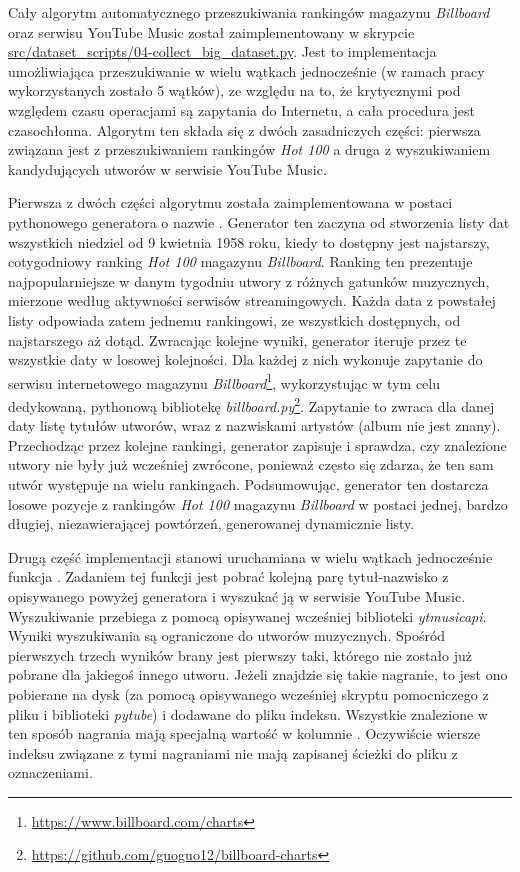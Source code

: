Cały algorytm automatycznego przeszukiwania rankingów magazynu \emph{Billboard} oraz serwisu YouTube Music został zaimplementowany w skrypcie \url{src/dataset_scripts/04-collect_big_dataset.py}. Jest to implementacja umożliwiająca przeszukiwanie w wielu wątkach jednocześnie (w ramach pracy wykorzystanych zostało 5 wątków), ze względu na to, że krytycznymi pod względem czasu operacjami są zapytania do Internetu, a cała procedura jest czasochłonna. Algorytm ten składa się z dwóch zasadniczych części: pierwsza związana jest z przeszukiwaniem rankingów \emph{Hot 100} a druga z wyszukiwaniem kandydujących utworów w serwisie YouTube Music.

Pierwsza z dwóch części algorytmu została zaimplementowana w postaci pythonowego generatora o nazwie . Generator ten zaczyna od stworzenia listy dat wszystkich niedziel od 9 kwietnia 1958 roku, kiedy to dostępny jest najstarszy, cotygodniowy ranking \emph{Hot 100} magazynu \emph{Billboard}. Ranking ten prezentuje najpopularniejsze w danym tygodniu utwory z różnych gatunków muzycznych, mierzone według aktywności serwisów streamingowych. Każda data z powstałej listy odpowiada zatem jednemu rankingowi, ze wszystkich dostępnych, od najstarszego aż dotąd. Zwracając kolejne wyniki, generator iteruje przez te wszystkie daty w losowej kolejności.  Dla każdej z nich wykonuje zapytanie do serwisu internetowego magazynu \emph{Billboard}\footnote{\url{https://www.billboard.com/charts}}, wykorzystując w tym celu dedykowaną, pythonową bibliotekę \emph{billboard.py}\footnote{\url{https://github.com/guoguo12/billboard-charts}}.  Zapytanie to zwraca dla danej daty listę tytułów utworów, wraz z nazwiskami artystów (album nie jest znany). Przechodząc przez kolejne rankingi, generator zapisuje i sprawdza, czy znalezione utwory nie były już wcześniej zwrócone, ponieważ często się zdarza, że ten sam utwór występuje na wielu rankingach. Podsumowując, generator ten dostarcza losowe pozycje z rankingów \emph{Hot 100} magazynu \emph{Billboard} w postaci jednej, bardzo długiej, niezawierającej powtórzeń, generowanej dynamicznie listy.

Drugą część implementacji stanowi uruchamiana w wielu wątkach jednocześnie funkcja . Zadaniem tej funkcji jest pobrać kolejną parę tytuł-nazwisko z opisywanego powyżej generatora i wyszukać ją w serwisie YouTube Music. Wyszukiwanie przebiega z pomocą opisywanej wcześniej biblioteki \emph{ytmusicapi}. Wyniki wyszukiwania są ograniczone do utworów muzycznych. Spośród pierwszych trzech wyników brany jest pierwszy taki, którego  nie zostało już pobrane dla jakiegoś innego utworu. Jeżeli znajdzie się takie nagranie, to jest ono pobierane na dysk (za pomocą opisywanego wcześniej skryptu pomocniczego z pliku i biblioteki \emph{pytube}) i dodawane do pliku indeksu. Wszystkie znalezione w ten sposób nagrania mają specjalną wartość  w kolumnie . Oczywiście wiersze indeksu związane z tymi nagraniami nie mają zapisanej ścieżki do pliku z oznaczeniami.

